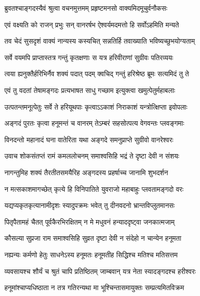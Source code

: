 \twolineshloka
{ब्रुवतश्चाङ्गदस्यैवं श्रुत्वा वचनमुत्तमम्}
{प्रहृष्टमनसो वाक्यमिदमूचुर्वनौकसः} %

\twolineshloka
{एवं वक्ष्यति को राजन् प्रभुः सन् वानरर्षभ}
{ऐश्वर्यमदमत्तो हि सर्वोऽहमिति मन्यते} %

\twolineshloka
{तव चेदं सुसदृशं वाक्यं नान्यस्य कस्यचित्}
{सन्नतिर्हि तवाख्याति भविष्यच्छुभयोग्यताम्} %

\twolineshloka
{सर्वे वयमपि प्राप्तास्तत्र गन्तुं कृतक्षणाः}
{स यत्र हरिवीराणां सुग्रीवः पतिरव्ययः} %

\twolineshloka
{त्वया ह्यनुक्तैर्हरिभिर्नैव शक्यं पदात् पदम्}
{क्वचिद् गन्तुं हरिश्रेष्ठ ब्रूमः सत्यमिदं तु ते} %

\twolineshloka
{एवं तु वदतां तेषामङ्गदः प्रत्यभाषत}
{साधु गच्छाम इत्युक्त्वा खमुत्पेतुर्महाबलाः} %

\twolineshloka
{उत्पतन्तमनूत्पेतुः सर्वे ते हरियूथपाः}
{कृत्वाऽऽकाशं निराकाशं यन्त्रोत्क्षिप्ता इवोपलाः} %

\twolineshloka
{अङ्गदं पुरतः कृत्वा हनूमन्तं च वानरम्}
{तेऽम्बरं सहसोत्पत्य वेगवन्तः प्लवङ्गमाः} %

\twolineshloka
{विनदन्तो महानादं घना वातेरिता यथा}
{अङ्गदे समनुप्राप्ते सुग्रीवो वानरेश्वरः} %

\twolineshloka
{उवाच शोकसंतप्तं रामं कमललोचनम्}
{समाश्वसिहि भद्रं ते दृष्टा देवी न संशयः} %

\twolineshloka
{नागन्तुमिह शक्यं तैरतीतसमयैरिह}
{अङ्गदस्य प्रहर्षाच्च जानामि शुभदर्शन} %

\twolineshloka
{न मत्सकाशमागच्छेत् कृत्ये हि विनिपातिते}
{युवराजो महाबाहुः प्लवतामङ्गदो वरः} %

\twolineshloka
{यद्यप्यकृतकृत्यानामीदृशः स्यादुपक्रमः}
{भवेत् तु दीनवदनो भ्रान्तविप्लुतमानसः} %

\twolineshloka
{पितृपैतामहं चैतत् पूर्वकैरभिरक्षितम्}
{न मे मधुवनं हन्याददृष्ट्वा जनकात्मजाम्} %

\twolineshloka
{कौसल्या सुप्रजा राम समाश्वसिहि सुव्रत}
{दृष्टा देवी न संदेहो न चान्येन हनूमता} %

\twolineshloka
{नह्यन्यः कर्मणो हेतुः साधनेऽस्य हनूमतः}
{हनूमतीह सिद्धिश्च मतिश्च मतिसत्तम} %

\twolineshloka
{व्यवसायश्च शौर्यं च श्रुतं चापि प्रतिष्ठितम्}
{जाम्बवान् यत्र नेता स्यादङ्गदश्च हरीश्वरः} %

\twolineshloka
{हनूमांश्चाप्यधिष्ठाता न तत्र गतिरन्यथा}
{मा भूश्चिन्तासमायुक्तः सम्प्रत्यमितविक्रम} %

